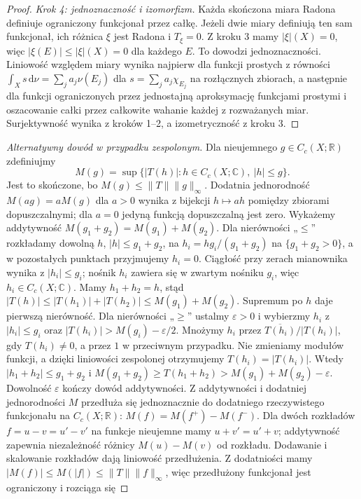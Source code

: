 \begin{proof}
\emph{Krok 4: jednoznaczność i izomorfizm.}
Każda skończona miara Radona definiuje ograniczony
funkcjonał przez całkę. Jeżeli dwie miary definiują
ten sam funkcjonał, ich różnica $\xi$ jest Radona
i $T_\xi=0$. Z kroku 3 mamy $|\xi|(X)=0$,
więc $|\xi(E)|\le|\xi|(X)=0$ dla każdego $E$.
To dowodzi jednoznaczności. Liniowość względem miary wynika najpierw dla
funkcji prostych z równości
$\int_X s\,\mathrm d\nu=\sum_j a_j\nu(E_j)$
dla $s=\sum_j a_j\chi_{E_j}$ na rozłącznych zbiorach,
a następnie dla funkcji ograniczonych przez jednostajną
aproksymację funkcjami prostymi i oszacowanie całki
przez całkowite wahanie każdej z rozważanych miar.
Surjektywność wynika z kroków 1--2, a izometryczność
z kroku 3.
\end{proof}

\begin{proof}[Alternatywny dowód w przypadku zespolonym]
Dla nieujemnego $g\in C_c(X;\mathbb R)$ zdefiniujmy
\[
 M(g)=\sup\{|T(h)|:h\in C_c(X;\mathbb C),\ |h|\le g\}.
\]
Jest to skończone, bo $M(g)\le\|T\|\|g\|_\infty$.
Dodatnia jednorodność $M(ag)=aM(g)$ dla $a>0$ wynika
z bijekcji $h\mapsto ah$ pomiędzy zbiorami dopuszczalnymi;
dla $a=0$ jedyną funkcją dopuszczalną jest zero.
Wykażemy addytywność $M(g_1+g_2)=M(g_1)+M(g_2)$.
Dla nierówności „$\le$” rozkładamy dowolną $h$,
$|h|\le g_1+g_2$, na $h_i=h g_i/(g_1+g_2)$ na
$\{g_1+g_2>0\}$, a w pozostałych punktach przyjmujemy
$h_i=0$. Ciągłość przy zerach mianownika wynika
z $|h_i|\le g_i$; nośnik $h_i$ zawiera się w zwartym
nośniku $g_i$, więc $h_i\in C_c(X;\mathbb C)$.
Mamy $h_1+h_2=h$, stąd
$|T(h)|\le |T(h_1)|+|T(h_2)|\le M(g_1)+M(g_2)$.
Supremum po $h$ daje pierwszą nierówność.
Dla nierówności „$\ge$” ustalmy $\varepsilon>0$ i wybierzmy
$h_i$ z $|h_i|\le g_i$ oraz $|T(h_i)|>M(g_i)-\varepsilon/2$.
Mnożymy $h_i$ przez $\overline{T(h_i)}/|T(h_i)|$,
gdy $T(h_i)\ne0$, a przez $1$ w przeciwnym przypadku.
Nie zmieniamy modułów funkcji, a dzięki liniowości zespolonej
otrzymujemy $T(h_i)=|T(h_i)|$. Wtedy $|h_1+h_2|\le g_1+g_2$
i $M(g_1+g_2)\ge T(h_1+h_2)>M(g_1)+M(g_2)-\varepsilon$.
Dowolność $\varepsilon$ kończy dowód addytywności.
Z addytywności i dodatniej jednorodności $M$ przedłuża
się jednoznacznie do dodatniego rzeczywistego funkcjonału
na $C_c(X;\mathbb R)$: $M(f)=M(f^+)-M(f^-)$.
Dla dwóch rozkładów $f=u-v=u'-v'$ na funkcje nieujemne
mamy $u+v'=u'+v$; addytywność zapewnia niezależność
różnicy $M(u)-M(v)$ od rozkładu. Dodawanie i skalowanie
rozkładów dają liniowość przedłużenia. Z dodatniości
mamy $|M(f)|\le M(|f|)\le\|T\|\|f\|_\infty$,
więc przedłużony funkcjonał jest ograniczony i rozciąga się

\end{proof}
